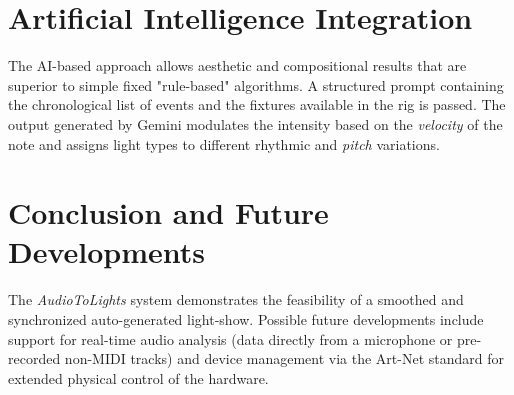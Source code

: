 \documentclass[12pt,a4paper]{article}
\begin{document}
\section{Artificial Intelligence Integration}
The AI-based approach allows aesthetic and compositional results that are superior to simple fixed "rule-based" algorithms. A structured prompt containing the chronological list of events and the fixtures available in the rig is passed. The output generated by Gemini modulates the intensity based on the \textit{velocity} of the note and assigns light types to different rhythmic and \textit{pitch} variations.

\section{Conclusion and Future Developments}
The \textit{AudioToLights} system demonstrates the feasibility of a smoothed and synchronized auto-generated light-show. Possible future developments include support for real-time audio analysis (data directly from a microphone or pre-recorded non-MIDI tracks) and device management via the Art-Net standard for extended physical control of the hardware.
\end{document}
